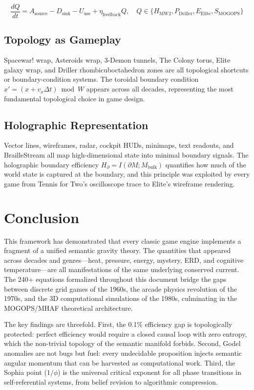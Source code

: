 \documentclass[11pt,a4paper]{article}
\theoremstyle{definition}
\begin{document}
\begin{equation}\label{eq:resource-universal}
\frac{dQ}{dt} = A_{\text{source}} - D_{\text{sink}} - U_{\text{use}} + \eta_{\text{feedback}}Q,\quad Q \in \{H_{\text{MW2}},P_{\text{Driller}},E_{\text{Elite}},S_{\text{MOGOPS}}\}
\end{equation}

\subsection{Topology as Gameplay}
Spacewar! wrap, Asteroids wrap, 3-Demon tunnels, The Colony torus, Elite galaxy wrap, and Driller rhombicuboctahedron zones are all topological shortcuts or boundary-condition systems. The toroidal boundary condition $x'=(x+v_x\Delta t)\bmod W$ appears across all decades, representing the most fundamental topological choice in game design.

\subsection{Holographic Representation}
Vector lines, wireframes, radar, cockpit HUDs, minimaps, text readouts, and BrailleStream all map high-dimensional state into minimal boundary signals. The holographic boundary efficiency $H_{\partial} = I(\partial M;M_{\text{bulk}})$ quantifies how much of the world state is captured at the boundary, and this principle was exploited by every game from Tennis for Two's oscilloscope trace to Elite's wireframe rendering.

\section{Conclusion}\label{sec:conclusion}

This framework has demonstrated that every classic game engine implements a fragment of a unified semantic gravity theory. The quantities that appeared across decades and genres---heat, pressure, energy, mystery, ERD, and cognitive temperature---are all manifestations of the same underlying conserved current. The 240+ equations formalized throughout this document bridge the gaps between discrete grid games of the 1960s, the arcade physics revolution of the 1970s, and the 3D computational simulations of the 1980s, culminating in the MOGOPS/MHAF theoretical architecture.

The key findings are threefold. First, the 0.1\% efficiency gap is topologically protected: perfect efficiency would require a closed causal loop with zero entropy, which the non-trivial topology of the semantic manifold forbids. Second, Godel anomalies are not bugs but fuel: every undecidable proposition injects semantic angular momentum that can be harvested as computational work. Third, the Sophia point ($1/\phi$) is the universal critical exponent for all phase transitions in self-referential systems, from belief revision to algorithmic compression.
\end{document}
